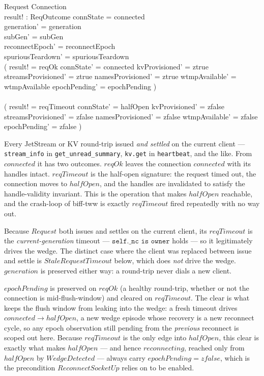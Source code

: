 \documentclass[a4paper,10pt,fleqn]{article}
\begin{document}
\begin{schema}{Request}
  \Delta Connection \\
  result! : ReqOutcome
  \where
  connState = connected \\
  generation' = generation \\
  subGen' = subGen \\
  reconnectEpoch' = reconnectEpoch \\
  spuriousTeardown' = spuriousTeardown \\
  ( result! = reqOk \land
    connState' = connected \land
    kvProvisioned' = ztrue \land
    streamsProvisioned' = ztrue \land
    namesProvisioned' = ztrue \land
    wtmpAvailable' = wtmpAvailable \land
    epochPending' = epochPending ) \\
  \lor \\
  ( result! = reqTimeout \land
    connState' = halfOpen \land
    kvProvisioned' = zfalse \land
    streamsProvisioned' = zfalse \land
    namesProvisioned' = zfalse \land
    wtmpAvailable' = zfalse \land
    epochPending' = zfalse )
\end{schema}

Every JetStream or KV round-trip issued \emph{and settled} on the
current client --- \texttt{stream\_info} in
\texttt{get\_unread\_summary}, \texttt{kv.get} in
\texttt{heartbeat}, and the like.  From $connected$ it has two
outcomes.  $reqOk$ leaves the connection $connected$ with its
handles intact.  $reqTimeout$ is the half-open signature: the
request timed out, the connection moves to $halfOpen$, and the
handles are invalidated to satisfy the handle-validity invariant.
This is the operation that makes $halfOpen$ reachable, and the
crash-loop of biff-tww is exactly $reqTimeout$ fired repeatedly
with no way out.

Because $Request$ both issues and settles on the current client,
its $reqTimeout$ is the \emph{current-generation} timeout ---
$\texttt{self.\_nc is owner}$ holds --- so it legitimately drives
the wedge.  The distinct case where the client was replaced
between issue and settle is $StaleRequestTimeout$ below, which does
\emph{not} drive the wedge.  $generation$ is preserved either way:
a round-trip never dials a new client.

$epochPending$ is preserved on $reqOk$ (a healthy round-trip, whether or
not the connection is mid-flush-window) and cleared on $reqTimeout$.  The
clear is what keeps the flush window from leaking into the wedge: a fresh
timeout drives $connected \to halfOpen$, a new wedge episode whose
recovery is a new reconnect cycle, so any epoch observation still pending
from the \emph{previous} reconnect is scoped out here.  Because
$reqTimeout$ is the only edge into $halfOpen$, this clear is exactly what
makes $halfOpen$ --- and hence $reconnecting$, reached only from
$halfOpen$ by $WedgeDetected$ --- always carry $epochPending = zfalse$,
which is the precondition $ReconnectSocketUp$ relies on to be enabled.
\end{document}
